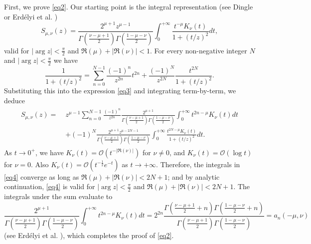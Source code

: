 \documentclass[a4paper,twoside,10pt]{amsart}
\numberwithin{equation}{section}
\begin{document}
First, we prove \eqref{eq2}. Our starting point is the integral representation (see Dingle \cite[p. 380]{Dingle} or Erd\'elyi et al. \cite[p. 230, entry (42)]{Erdelyi2})
\begin{equation}\label{eq3}
S_{\mu ,\nu } \left( z \right) = \frac{{2^{\mu  + 1} z^{\mu  - 1} }}{{\Gamma \left( {\frac{{\nu  - \mu  + 1}}{2}} \right)\Gamma \left( {\frac{{1 - \mu  - \nu }}{2}} \right)}}\int_0^{ + \infty } {\frac{{t^{ - \mu } K_\nu  \left( t \right)}}{{1 + \left( {t/z} \right)^2 }}dt} ,
\end{equation}
valid for $\left|\arg z\right| < \frac{\pi}{2}$ and $\Re \left( \mu  \right) + \left| {\Re \left( \nu  \right)} \right|<1$. For every non-negative integer $N$ and $\left|\arg z\right| < \frac{\pi}{2}$ we have
\[
\frac{1}{{1 + \left( {t/z} \right)^2 }} = \sum\limits_{n = 0}^{N - 1} {\frac{{\left( { - 1} \right)^n }}{{z^{2n} }}t^{2n} }  + \frac{{\left( { - 1} \right)^N }}{z^{2N}}\frac{{t^{2N} }}{{1 + \left( {t/z} \right)^2 }} .
\]
Substituting this into the expression \eqref{eq3} and integrating term-by-term, we deduce
\begin{gather}\label{eq4}
\begin{split}
S_{\mu ,\nu } \left( z \right) = \; & z^{\mu  - 1} \sum\limits_{n = 0}^{N - 1} {\frac{{\left( { - 1} \right)^n }}{{z^{2n} }}\frac{{2^{\mu  + 1} }}{{\Gamma \left( {\frac{{\nu  - \mu  + 1}}{2}} \right)\Gamma \left( {\frac{{1 - \mu  - \nu }}{2}} \right)}}\int_0^{ + \infty } {t^{2n - \mu } K_\nu  \left( t \right)dt} } \\ & + \left( { - 1} \right)^N \frac{{2^{\mu  + 1} z^{\mu  - 2N - 1} }}{{\Gamma \left( {\frac{{\nu  - \mu  + 1}}{2}} \right)\Gamma \left( {\frac{{1 - \mu  - \nu }}{2}} \right)}}\int_0^{ + \infty } {\frac{{t^{2N - \mu } K_\nu  \left( t \right)}}{{1 + \left( {t/z} \right)^2 }}dt} .
\end{split}
\end{gather}
As $t\to 0^+$, we have $K_\nu  \left( t \right) = \mathcal{O}\left( {t^{ - \left|\Re\left(\nu\right)\right| } } \right)$ for $\nu \neq 0$, and $K_\nu  \left( t \right) = \mathcal{O}\left(\log t \right)$ for $\nu = 0$. Also $K_\nu  \left( t \right) = \mathcal{O}\left( {t^{ - \frac{1}{2}} e^{ - t} } \right)$ as $t\to +\infty$. Therefore, the integrals in \eqref{eq4} converge as long as $\Re \left( \mu  \right) + \left| {\Re \left( \nu  \right)} \right|< 2N + 1$; and by analytic continuation, \eqref{eq4} is valid for $\left|\arg z\right| < \frac{\pi}{2}$ and $\Re \left( \mu  \right) + \left| {\Re \left( \nu  \right)} \right|< 2N + 1$. The integrals under the sum evaluate to
\[
\frac{{2^{\mu  + 1} }}{{\Gamma \left( {\frac{{\nu  - \mu  + 1}}{2}} \right)\Gamma \left( {\frac{{1 - \mu  - \nu }}{2}} \right)}}\int_0^{ + \infty } {t^{2n - \mu } K_\nu  \left( t \right)dt}  = 2^{2n} \frac{{\Gamma \left( {\frac{{\nu  - \mu  + 1}}{2} + n} \right)\Gamma \left( {\frac{{1 - \mu  - \nu }}{2} + n} \right)}}{{\Gamma \left( {\frac{{\nu  - \mu  + 1}}{2}} \right)\Gamma \left( {\frac{{1 - \mu  - \nu }}{2}} \right)}} = a_n \left( { - \mu ,\nu } \right)
\]
(see Erd\'elyi et al. \cite[p. 331, entry (26)]{Erdelyi1}), which completes the proof of \eqref{eq2}.
\end{document}
